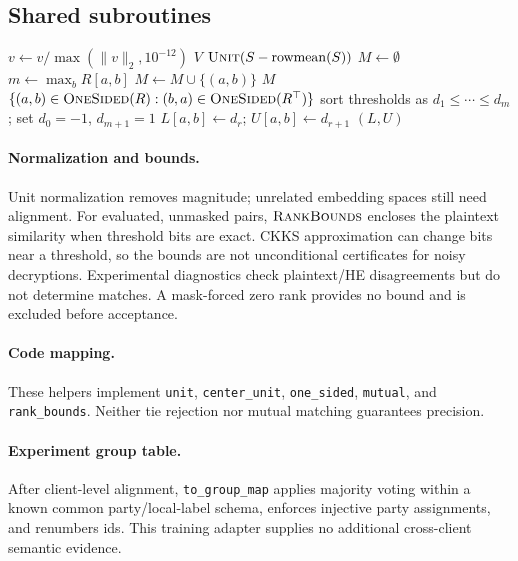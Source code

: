 \documentclass[11pt]{article}
\newcommand{\onesided}{\textsc{OneSided}}
\newcommand{\unit}{\textsc{Unit}}
\newcommand{\bounds}{\textsc{RankBounds}}
\begin{document}
\clearpage
\subsection*{Shared subroutines}
\label{sec:sub}
\small
\begin{algorithmic}[1]
  \State $v\gets v/\max(\lVert v\rVert_2,10^{-12})$
 \EndFor
 \State \Return $V$
\EndProcedure
\Statex
{}
 \State \Return $\unit(S-\operatorname{rowmean}(S))$
\EndProcedure
\Statex
{}
 \State $M\gets\emptyset$
  \State $m\gets\max_b R[a,b]$
   \State $M\gets M\cup\{(a,b)\}$
  \EndIf
 \EndFor
 \State \Return $M$ 
\EndProcedure
\Statex
{}
 \State \Return $\{(a,b)\in\onesided(R):(b,a)\in\onesided(R^\top)\}$
\EndProcedure
\Statex
{}
 \State sort thresholds as $d_1\le\cdots\le d_m$; set $d_0=-1$, $d_{m+1}=1$
  \State $L[a,b]\gets d_r$; $U[a,b]\gets d_{r+1}$
 \EndFor
 \State \Return $(L,U)$
\EndProcedure
\end{algorithmic}
\small
\paragraph{Normalization and bounds.}
Unit normalization removes magnitude; unrelated embedding spaces still need
alignment. For evaluated, unmasked pairs, $\bounds$ encloses the plaintext
similarity when threshold bits are exact. CKKS approximation can change bits
near a threshold, so the bounds are not unconditional certificates for noisy
decryptions. Experimental diagnostics check plaintext/HE disagreements but
do not determine matches. A mask-forced zero rank provides no bound and is
excluded before acceptance.

\paragraph{Code mapping.}
These helpers implement \texttt{unit}, \texttt{center\_unit},
\texttt{one\_sided}, \texttt{mutual}, and \texttt{rank\_bounds}.
Neither tie rejection nor mutual matching guarantees precision.

\paragraph{Experiment group table.}
After client-level alignment, \texttt{to\_group\_map} applies majority voting
within a known common party/local-label schema, enforces injective party
assignments, and renumbers ids. This training adapter supplies no additional
cross-client semantic evidence.
\normalsize
\clearpage
\end{document}

